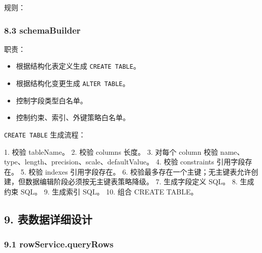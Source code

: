 \documentclass[
  a4paper,
  UTF8]{ctexart}
\newenvironment{Shaded}{}{}
\newcommand{\NormalTok}[1]{#1}
\providecommand{\tightlist}{%
  \setlength{\itemsep}{0pt}\setlength{\parskip}{0pt}}
\begin{document}
规则：

\begin{Shaded}
\end{Shaded}

\hypertarget{schemabuilder}{%
\subsubsection{8.3 schemaBuilder}\label{schemabuilder}}

职责：

\begin{itemize}
\tightlist
\item
  根据结构化表定义生成 \texttt{CREATE\ TABLE}。
\item
  根据结构化变更生成 \texttt{ALTER\ TABLE}。
\item
  控制字段类型白名单。
\item
  控制约束、索引、外键策略白名单。
\end{itemize}

\texttt{CREATE\ TABLE} 生成流程：

\begin{Shaded}
\begin{Highlighting}[]
\NormalTok{1. 校验 tableName。}
\NormalTok{2. 校验 columns 长度。}
\NormalTok{3. 对每个 column 校验 name、type、length、precision、scale、defaultValue。}
\NormalTok{4. 校验 constraints 引用字段存在。}
\NormalTok{5. 校验 indexes 引用字段存在。}
\NormalTok{6. 校验最多存在一个主键；无主键表允许创建，但数据编辑阶段必须按无主键表策略降级。}
\NormalTok{7. 生成字段定义 SQL。}
\NormalTok{8. 生成约束 SQL。}
\NormalTok{9. 生成索引 SQL。}
\NormalTok{10. 组合 CREATE TABLE。}
\end{Highlighting}
\end{Shaded}

\hypertarget{ux8868ux6570ux636eux8be6ux7ec6ux8bbeux8ba1}{%
\subsection{9.
表数据详细设计}\label{ux8868ux6570ux636eux8be6ux7ec6ux8bbeux8ba1}}

\hypertarget{rowservice.queryrows}{%
\subsubsection{9.1 rowService.queryRows}\label{rowservice.queryrows}}
\end{document}

